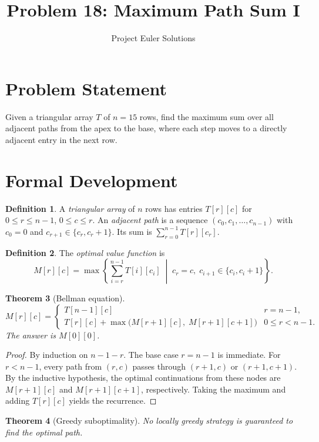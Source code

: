 \documentclass[12pt,a4paper]{article}
\title{Problem 18: Maximum Path Sum I}
\author{Project Euler Solutions}
\date{}
\newtheorem{theorem}{Theorem}
\theoremstyle{definition}
\newtheorem{definition}[theorem]{Definition}
\begin{document}
\maketitle

\section{Problem Statement}
Given a triangular array $T$ of $n = 15$ rows, find the maximum sum over all adjacent
paths from the apex to the base, where each step moves to a directly adjacent entry
in the next row.

\section{Formal Development}

\begin{definition}
A \emph{triangular array} of $n$ rows has entries $T[r][c]$ for $0 \le r \le n-1$,
$0 \le c \le r$. An \emph{adjacent path} is a sequence $(c_0, c_1, \ldots, c_{n-1})$
with $c_0 = 0$ and $c_{r+1} \in \{c_r, c_r + 1\}$. Its sum is $\sum_{r=0}^{n-1} T[r][c_r]$.
\end{definition}

\begin{definition}
The \emph{optimal value function} is
\[
M[r][c] = \max\!\left\{\sum_{i=r}^{n-1} T[i][c_i] \;\middle|\;
c_r = c,\; c_{i+1} \in \{c_i, c_i+1\}\right\}.
\]
\end{definition}

\begin{theorem}[Bellman equation]
\label{thm:bellman}
\[
M[r][c] = \begin{cases}
T[n{-}1][c] & r = n-1, \\
T[r][c] + \max\bigl(M[r{+}1][c],\; M[r{+}1][c{+}1]\bigr) & 0 \le r < n-1.
\end{cases}
\]
The answer is $M[0][0]$.
\end{theorem}

\begin{proof}
By induction on $n - 1 - r$. The base case $r = n - 1$ is immediate. For $r < n - 1$,
every path from $(r, c)$ passes through $(r{+}1, c)$ or $(r{+}1, c{+}1)$. By the inductive
hypothesis, the optimal continuations from these nodes are $M[r{+}1][c]$ and $M[r{+}1][c{+}1]$,
respectively. Taking the maximum and adding $T[r][c]$ yields the recurrence.
\end{proof}

\begin{theorem}[Greedy suboptimality]
No locally greedy strategy is guaranteed to find the optimal path.
\end{theorem}
\end{document}
